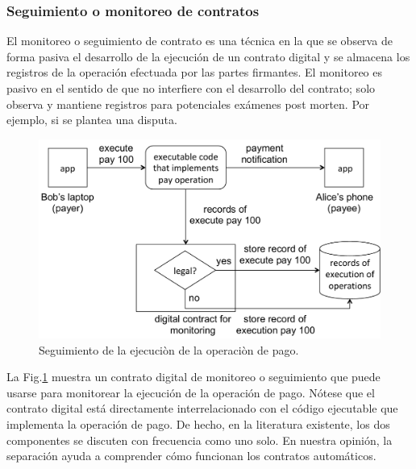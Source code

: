 \documentclass[12pt]{report} %
\begin{document}
\subsubsection{Seguimiento o monitoreo de contratos}
\label{seguimientodelcontrato}

El monitoreo o seguimiento de contrato es una técnica en la que se observa de forma pasiva el desarrollo de la ejecución de un contrato digital y se almacena los registros de la operación efectuada por las partes firmantes. El monitoreo es pasivo en el sentido de que no interfiere con el desarrollo del contrato; solo observa y mantiene registros para potenciales exámenes post morten. Por ejemplo, si se plantea una disputa.

\begin{figure}
\centering
\includegraphics[width=0.55\columnwidth]{figures/exepaymonitor.pdf}
\caption{Seguimiento de la ejecuciòn de la operaciòn de pago.}
\label{fig:exepaymonitor}
\end{figure}



La Fig.\ref{fig:exepaymonitor} muestra un contrato digital de monitoreo o seguimiento que puede usarse para monitorear la ejecución de la operación de pago. Nótese que el contrato digital está directamente interrelacionado con el código ejecutable que implementa la operación de pago. De hecho, en la literatura existente, los dos componentes se discuten con frecuencia como uno solo. En nuestra opinión, la separación ayuda a comprender cómo funcionan los contratos automáticos.
\end{document}
